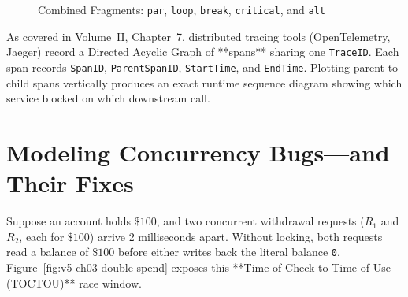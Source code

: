 \begin{figure}[htbp]
\caption{Combined Fragments: \texttt{par}, \texttt{loop}, \texttt{break}, \texttt{critical}, and \texttt{alt}}
\label{fig:v5-ch03-combined-fragments}
\end{figure}

\begin{underthehoodbox}
As covered in Volume~II, Chapter~7, distributed tracing tools (OpenTelemetry, Jaeger) record a Directed Acyclic Graph of **spans** sharing one \texttt{TraceID}. Each span records \texttt{SpanID}, \texttt{ParentSpanID}, \texttt{StartTime}, and \texttt{EndTime}. Plotting parent-to-child spans vertically produces an exact runtime sequence diagram showing which service blocked on which downstream call.
\end{underthehoodbox}

\section{Modeling Concurrency Bugs---and Their Fixes}

Suppose an account holds $\$100$, and two concurrent withdrawal requests ($R_1$ and $R_2$, each for $\$100$) arrive 2 milliseconds apart. Without locking, both requests read a balance of $\$100$ before either writes back the literal balance \texttt{0}. Figure~\ref{fig:v5-ch03-double-spend} exposes this **Time-of-Check to Time-of-Use (TOCTOU)** race window.

